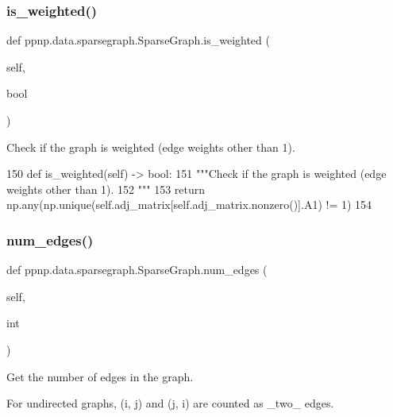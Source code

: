 \subsubsection{\texorpdfstring{is\+\_\+weighted()}{is\_weighted()}}
{\footnotesize\ttfamily def ppnp.\+data.\+sparsegraph.\+Sparse\+Graph.\+is\+\_\+weighted (\begin{DoxyParamCaption}\item[{}]{self,  }\item[{}]{bool }\end{DoxyParamCaption})}

\begin{DoxyVerb}Check if the graph is weighted (edge weights other than 1).
\end{DoxyVerb}
 
\begin{DoxyCode}
150     \textcolor{keyword}{def }is\_weighted(self) -> bool:
151         \textcolor{stringliteral}{"""Check if the graph is weighted (edge weights other than 1).}
152 \textcolor{stringliteral}{        """}
153         \textcolor{keywordflow}{return} np.any(np.unique(self.adj\_matrix[self.adj\_matrix.nonzero()].A1) != 1)
154 
\end{DoxyCode}
\mbox{\label{classppnp_1_1data_1_1sparsegraph_1_1SparseGraph_aa2fd9dcc93eb10b66589e09ca705a8d5}} 
\subsubsection{\texorpdfstring{num\+\_\+edges()}{num\_edges()}}
{\footnotesize\ttfamily def ppnp.\+data.\+sparsegraph.\+Sparse\+Graph.\+num\+\_\+edges (\begin{DoxyParamCaption}\item[{}]{self,  }\item[{}]{int }\end{DoxyParamCaption})}

\begin{DoxyVerb}Get the number of edges in the graph.

For undirected graphs, (i, j) and (j, i) are counted as _two_ edges.\end{DoxyVerb}
 

